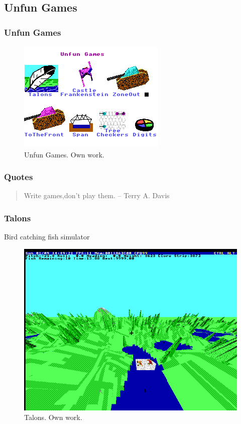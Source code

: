 \documentclass{beamer}
\begin{document}
	\subsection{Unfun Games}
	\begin{frame}
		\frametitle{Unfun Games}
		\begin{figure}
			\centering
			\includegraphics[width=0.5\linewidth]{images/unfun_games.png}
			\caption{Unfun Games. Own work.}
			\label{fig:unfun_games}
		\end{figure}
		\vspace{0.5em}

		\frametitle{Quotes}
		\begin{quote}
			Write games,don't play them. \flushright -- Terry A. Davis
		\end{quote}
	\end{frame}

	\begin{frame}
		\frametitle{Talons}
		Bird catching fish simulator
		\begin{figure}
			\centering
			\includegraphics[width=0.6\linewidth]{images/talons.png}
			\caption{Talons. Own work.}
			\label{fig:talons}
		\end{figure}
	\end{frame}
\end{document}
